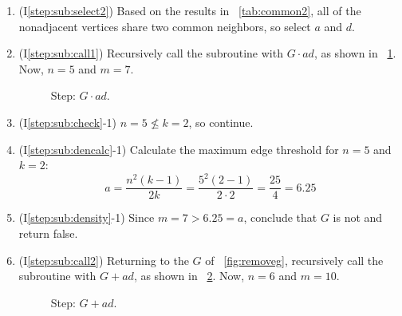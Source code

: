 \begin{enumerate}
\item (I\ref{step:sub:select2}) Based on the results in \tablename~\ref{tab:common2}, all of the nonadjacent
  vertices share two common neighbors, so select \(a\) and \(d\).

\item (I\ref{step:sub:call1}) Recursively call the subroutine with \(G\cdot ad\), as shown in
  \figurename~\ref{fig:contract1}.  Now, \(n=5\) and \(m=7\).

  \begin{figure}[H]
    \centering
    \caption{Step: \(G\cdot ad\).}
    \label{fig:contract1}
  \end{figure}

\item (I\ref{step:sub:check}-1) \(n=5\nleq k=2\), so continue.

\item (I\ref{step:sub:dencalc}-1) Calculate the maximum edge threshold for \(n=5\) and \(k=2\):
  \[a=\frac{n^2(k-1)}{2k}=\frac{5^2(2-1)}{2\cdot2}=\frac{25}{4}=6.25\]

\item (I\ref{step:sub:density}-1) Since \(m=7>6.25=a\), conclude that \(G\) is not  and return false.

\item (I\ref{step:sub:call2}) Returning to the \(G\) of \figurename~\ref{fig:removeg}, recursively call the
  subroutine with \(G+ad\), as shown in \figurename~\ref{fig:edge1}.  Now, \(n=6\) and \(m=10\).

  \begin{figure}[H]
    \centering
    \caption{Step: \(G+ad\).}
    \label{fig:edge1}
  \end{figure}


\end{enumerate}
